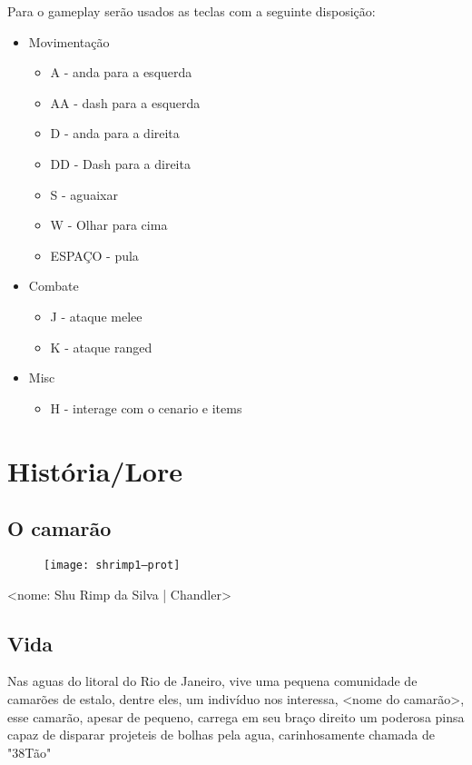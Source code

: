     Para o gameplay serão usados as teclas com a seguinte disposição:
    \begin{itemize}
        \item Movimentação
        \begin{itemize}
            \item A  - anda para a esquerda
            \item AA - dash para a esquerda
            \item D  - anda para a direita
            \item DD - Dash para a direita
            \item S  - aguaixar
            \item W  - Olhar para cima
            \item ESPAÇO - pula
        \end{itemize}
 
        \item Combate
        \begin{itemize}
            \item J - ataque melee
            \item K - ataque ranged
        \end{itemize}

        \item Misc
        \begin{itemize}
            \item H - interage com o cenario e items
        \end{itemize}

    \end{itemize}
    
\section{História/Lore}%
    \subsection{O camarão}%
        \begin{figure}[H]
            \texttt{[image: shrimp1--prot]}
        \centering
        \end{figure}

<nome: Shu Rimp da Silva | Chandler>

    \subsection{Vida}%
Nas aguas do litoral do Rio de Janeiro, vive uma pequena comunidade de camarões de estalo, dentre eles, um indivíduo nos interessa, <nome do camarão>, esse camarão, apesar de pequeno, carrega em seu braço direito um poderosa pinsa capaz de disparar projeteis de bolhas pela agua, carinhosamente chamada de "38Tão" 
